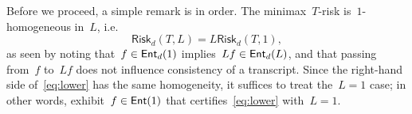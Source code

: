 \documentclass[11pt]{article}
\numberwithin{equation}{section}
\theoremstyle{remark}
\newcommand{\ri}{\operatorname{ri}}
\newcommand{\Ent}{\textup{\textsf{Ent}}}
\newcommand{\FOM}{\textsf{FOM}}
\newcommand{\Fh}{\Ent_d}
\newcommand{\Simp}{\Delta_d}
\newcommand{\Opt}{\operatorname{Opt}}
\newcommand{\Risk}{\mathsf{Risk}}
\newcommand{\1}{\mathbf{1}}
\newcommand{\bnabla}{\nabla}
\begin{document}

 

%
%

Before we proceed, a simple remark is in order. The minimax~$T$-risk is~$1$-homogeneous in~$L$, i.e.
\begin{equation}
\label{eq:risk-homogeneity}
\Risk_d(T,L) = L\Risk_d(T,1),
\end{equation}
as seen by noting that~$f \in \Fh(1)$ implies~$Lf \in \Fh(L)$, and that passing from~$f$ to~$Lf$ does not influence consistency of a transcript.
Since the right-hand side of~\eqref{eq:lower} has the same homogeneity, it suffices to treat the~$L = 1$ case; in other words, exhibit~$f \in \Ent(1)$ that certifies~\eqref{eq:lower} with~$L = 1$.
\end{document}
